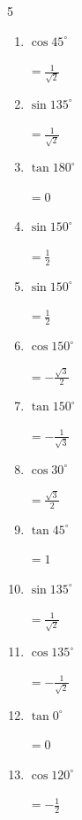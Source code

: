 \begin{multicols}{5}
\begin{enumerate}
  \item $\displaystyle \cos{45^\circ}$

        $\displaystyle =\frac{1}{\sqrt{2}}$

  \item $\displaystyle \sin{135^\circ}$

        $\displaystyle =\frac{1}{\sqrt{2}}$

  \item $\displaystyle \tan{180^\circ}$

        $\displaystyle =0$

  \item $\displaystyle \sin{150^\circ}$

        $\displaystyle =\frac{1}{2}$

  \item $\displaystyle \sin{150^\circ}$

        $\displaystyle =\frac{1}{2}$

  \item $\displaystyle \cos{150^\circ}$

        $\displaystyle =-\frac{\sqrt{3}}{2}$

  \item $\displaystyle \tan{150^\circ}$

        $\displaystyle =-\frac{1}{\sqrt{3}}$

  \item $\displaystyle \cos{30^\circ}$

        $\displaystyle =\frac{\sqrt{3}}{2}$

  \item $\displaystyle \tan{45^\circ}$

        $\displaystyle =1$

\columnbreak %

  \item $\displaystyle \sin{135^\circ}$

        $\displaystyle =\frac{1}{\sqrt{2}}$

  \item $\displaystyle \cos{135^\circ}$

        $\displaystyle =-\frac{1}{\sqrt{2}}$

  \item $\displaystyle \tan{0^\circ}$

        $\displaystyle =0$

  \item $\displaystyle \cos{120^\circ}$

        $\displaystyle =-\frac{1}{2}$


\end{enumerate}
\end{multicols}
